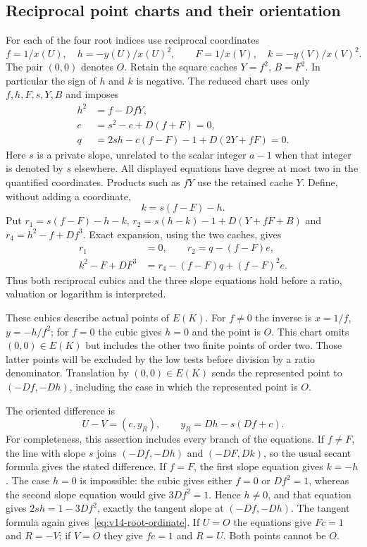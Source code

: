 \subsection{Reciprocal point charts and their orientation}
\label{subsec:v14-reciprocal}
For each of the four root indices use reciprocal coordinates
\[
 f=1/x(U),\quad h=-y(U)/x(U)^2,\qquad
 F=1/x(V),\quad k=-y(V)/x(V)^2.
\]
The pair $(0,0)$ denotes $O$. Retain the square caches $Y=f^2$,
$B=F^2$. In particular the sign of $h$ and $k$ is negative.
The reduced chart uses only $f,h,F,s,Y,B$ and imposes
\begin{align}
 h^2&=f-DfY,\label{eq:v14-primary-curve}\\
 e&=s^2-c+D(f+F)=0,\label{eq:v14-slope-square}\\
 q&=2sh-c(f-F)-1+D(2Y+fF)=0.\label{eq:v14-reduced-slope}
\end{align}
Here $s$ is a private slope, unrelated to the scalar integer
$a-1$ when that integer is denoted by $s$ elsewhere.
All displayed equations have degree at most two in the quantified
coordinates. Products such as $fY$ use the retained cache $Y$.
Define, without adding a coordinate,
\[
 k=s(f-F)-h.
\]
Put $r_1=s(f-F)-h-k$, $r_2=s(h-k)-1+D(Y+fF+B)$ and
$r_4=h^2-f+Df^3$. Exact expansion, using the two caches, gives
\begin{align}
 r_1&=0,\qquad r_2=q-(f-F)e,\label{eq:v14-slope-restoration}\\
 k^2-F+DF^3&=r_4-(f-F)q+(f-F)^2e.\label{eq:v14-alt-restoration}
\end{align}
Thus both reciprocal cubics and the three slope equations hold
before a ratio, valuation or logarithm is interpreted.

These cubics describe actual points of $E(K)$. For $f\ne0$ the
inverse is $x=1/f$, $y=-h/f^2$; for $f=0$ the cubic gives $h=0$
and the point is $O$. This chart omits $(0,0)\in E(K)$ but includes
the other two finite points of order two. Those latter points will
be excluded by the low tests before division by a ratio denominator.
Translation by $(0,0)\in E(K)$ sends the represented point to
$(-Df,-Dh)$, including the case in which the represented point
is $O$.

The oriented difference is
\begin{equation}\label{eq:v14-root-ordinate}
 U-V=(c,y_R),\qquad y_R=Dh-s(Df+c).
\end{equation}
For completeness, this assertion includes every branch of the
equations. If $f\ne F$, the line with slope $s$ joins
$(-Df,-Dh)$ and $(-DF,Dk)$, so the usual secant formula gives
the stated difference. If $f=F$, the first slope equation gives
$k=-h$. The case $h=0$ is impossible: the cubic gives either
$f=0$ or $Df^2=1$, whereas the second slope equation would give
$3Df^2=1$. Hence $h\ne0$, and that equation gives
$2sh=1-3Df^2$, exactly the tangent slope at $(-Df,-Dh)$.
The tangent formula again gives~\eqref{eq:v14-root-ordinate}.
If $U=O$ the equations give $Fc=1$ and $R=-V$; if $V=O$ they
give $fc=1$ and $R=U$. Both points cannot be $O$.

